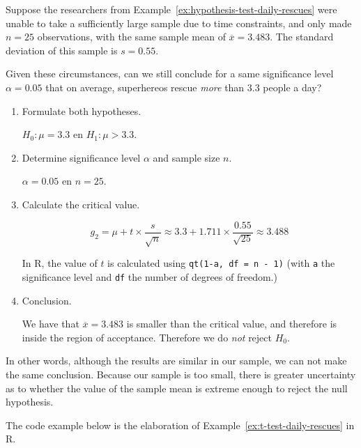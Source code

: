 \begin{example}
  \label{ex:t-test-daily-rescues}

  Suppose the researchers from Example~\ref{ex:hypothesis-test-daily-rescues} were unable to take a sufficiently large sample due to time constraints, and only made $n = 25$ observations, with the same sample mean of $\overline{x} = 3.483$. The standard deviation of this sample is $ s = 0.55 $.
  
  Given these circumstances, can we still conclude for a same significance level $\alpha = 0.05$ that on average, superhereos rescue \emph{more} than 3.3 people a day?
  
  \begin{enumerate}
    \item Formulate both hypotheses.
    
      $H_{0} : \mu = 3.3$ en $H_{1}: \mu > 3.3$.
    
    \item Determine significance level $\alpha$ and sample size $n$.
    
    $\alpha = 0.05$ en $n=25$.
    
    \item Calculate the critical value.
    
    \[ g_{2} = \mu + t \times \frac{s}{\sqrt{n}} \approx 3.3 + 1.711 \times \frac{0.55}{\sqrt{25}} \approx 3.488 \]
    
    In R, the value of $t$ is calculated using \texttt{qt(1-a, df = n - 1)} (with \texttt{a} the significance level and \texttt{df} the number of degrees of freedom.)
    
    \item Conclusion.
    
    We have that $\overline{x} = 3.483$ is smaller than the critical value, and therefore is inside the region of acceptance. Therefore we do \emph{not} reject $H_{0}$.
  \end{enumerate}

  In other words, although the results are similar in our sample, we can not make the same conclusion. Because our sample is too small, there is greater uncertainty as to whether the value of the sample mean is extreme enough to reject the null hypothesis.
  
  The code example below is the elaboration of Example~\ref{ex:t-test-daily-rescues} in R.
\end{example}



